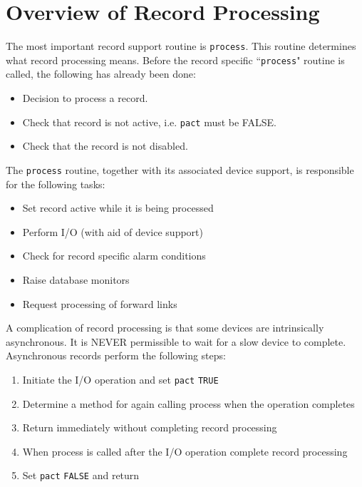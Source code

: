\section{Overview of Record Processing}

The most important record support routine is \verb|process|. This routine determines what record processing means. Before 
the record specific ``\verb|process|" routine is called, the following has already been done:

\begin{itemize}
\item Decision to process a record.

\item Check that record is not active, i.e. \verb|pact| must be FALSE.

\item Check that the record is not disabled.

\end{itemize}

The \verb|process| routine, together with its associated device support, is responsible for the following tasks:

\begin{itemize}
\item Set record active while it is being processed

\item Perform I/O (with aid of device support)

\item Check for record specific alarm conditions

\item Raise database monitors

\item Request processing of forward links

\end{itemize}

A complication of record processing is that some devices are intrinsically asynchronous. It is NEVER permissible to wait 
for a slow device to complete. Asynchronous records perform the following steps:

\begin{enumerate}
\item Initiate the I/O operation and set \verb|pact| \verb|TRUE|

\item Determine a method for again calling process when the operation completes

\item Return immediately without completing record processing

\item When process is called after the I/O operation complete record processing

\item Set \verb|pact| \verb|FALSE| and return

\end{enumerate}

